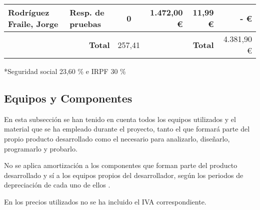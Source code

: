 \begin{table}[H]
{\begin{tabular}{ll|c|rr|r|}
			\multicolumn{1}{|l|}{Rodríguez Fraile, Jorge}                             & Resp. de pruebas                                            & 0                                       & \multicolumn{1}{r|}{1.472,00 €}                              & 11,99 €                                                                              & -   €                                                                                \\ \hline
			                                                                          & \multicolumn{1}{r|}{\textbf{Total}}                         & 257,41                                  & \multicolumn{1}{l}{}                                         & \textbf{Total}                                                                       & 4.381,90 €                                                                           \\ \cline{3-3} \cline{6-6}
		\end{tabular}%
	}
\end{table}

*Seguridad social 23,60 \% \cite{noauthor_seguridad_nodate} e IRPF 30 \% \cite{trecet_irpf_nodate}

\subsection{Equipos y Componentes}
En esta subsección se han tenido en cuenta todos los equipos utilizados y el material que se ha empleado durante el proyecto, tanto el que formará parte del propio producto desarrollado como el necesario para analizarlo, diseñarlo, programarlo y probarlo.

No se aplica amortización a los componentes que forman parte del producto desarrollado y sí a los equipos propios del desarrollador, según los periodos de depreciación de cada uno de ellos \cite{thiebaud_-muller_service_2018}.

En los precios utilizados no se ha incluido el IVA correspondiente.

